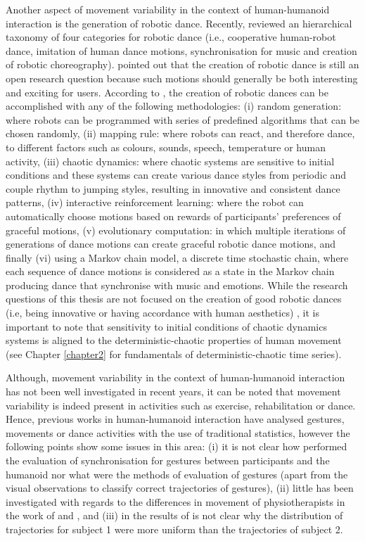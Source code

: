 Another aspect of movement variability in the context of human-humanoid 
interaction is the generation of robotic dance.
Recently, \cite{peng2015} reviewed an hierarchical taxonomy of 
four categories for robotic dance (i.e., cooperative human-robot dance, 
imitation of human dance motions, synchronisation for music and 
creation of robotic choreography).
\cite{peng2015} pointed out that the creation of robotic dance is still 
an open research question because such motions should generally be both 
interesting and exciting for users. 
According to \cite{peng2015}, the creation of robotic dances can be 
accomplished with any of the following methodologies:
(i) random generation: where robots can be 
programmed with series of predefined algorithms that can be chosen randomly,
(ii) mapping rule:  where robots can react, and therefore dance, to different 
factors such as colours, sounds, speech, temperature or human activity,
(iii) chaotic dynamics: where chaotic systems are sensitive 
to initial conditions and these systems can create various 
dance styles from periodic and couple rhythm to jumping styles,
resulting in innovative and consistent dance patterns,
(iv) interactive reinforcement learning: where the robot can automatically 
choose motions based on rewards of participants' 
preferences of graceful motions,
(v) evolutionary computation: in which multiple iterations of generations
of dance motions can create graceful robotic dance motions, and
finally (vi) using a Markov chain model, a discrete time stochastic chain, 
where each sequence of dance motions is considered as a state in the Markov 
chain producing dance that synchronise with music and emotions.
While the research questions of this thesis are not focused on 
the creation of good robotic dances (i.e, being innovative or having 
accordance with human aesthetics) \citep{peng2015}, 
it is important to note that sensitivity to initial conditions 
of chaotic dynamics systems is aligned to
the deterministic-chaotic properties of human movement
(see Chapter \ref{chapter2} for fundamentals of 
deterministic-chaotic time series).

Although, movement variability in the context of human-humanoid interaction
has not been well investigated in recent years, it can be noted 
that movement variability is indeed present in activities such as 
exercise, rehabilitation or dance. 
Hence, previous works in human-humanoid interaction have analysed gestures, 
movements or dance activities with the use of traditional statistics, 
however the following points show some issues in this area: 
(i) it is not clear how \cite{gorer2013} performed the evaluation of 
synchronisation for gestures between participants and the humanoid
nor what were the methods of evaluation of gestures
(apart from the visual observations to classify correct 
trajectories of gestures),  
(ii) little has been investigated with regards to the 
differences in movement of physiotherapists in the work of
\cite{guneysu2014} and  \cite{guneysu2015}, and 
(iii) in the results of \cite{tsuchida2013}
is not clear why the distribution of trajectories for subject 1 
were more uniform than the trajectories of subject 2.

